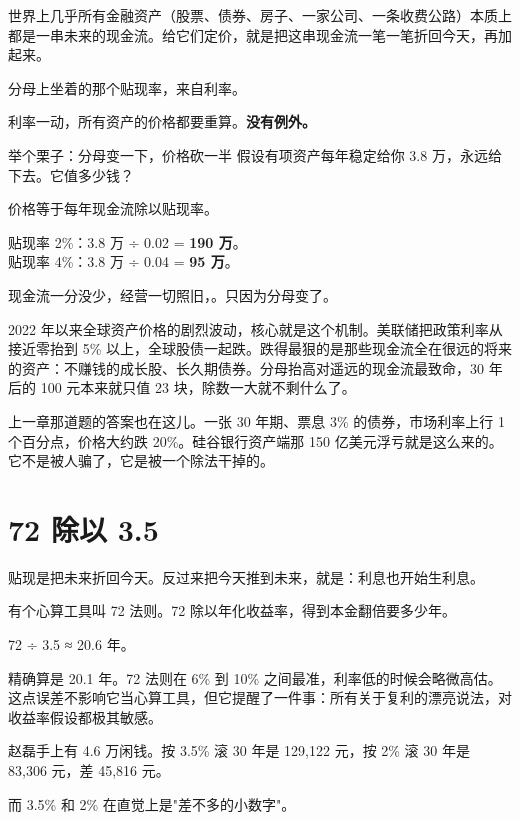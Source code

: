 世界上几乎所有金融资产（股票、债券、房子、一家公司、一条收费公路）本质上都是一串未来的现金流。给它们定价，就是把这串现金流一笔一笔折回今天，再加起来。

分母上坐着的那个贴现率，来自利率。

\begin{pullquote}{}
利率一动，所有资产的价格都要重算。\textbf{没有例外。}
\end{pullquote}

\begin{egbox}{举个栗子：分母变一下，价格砍一半}
假设有项资产每年稳定给你 3.8 万，永远给下去。它值多少钱？

价格等于每年现金流除以贴现率。

贴现率 2\%：3.8 万 ÷ 0.02 = \textbf{190 万}。\\ 贴现率 4\%：3.8 万 ÷ 0.04 = \textbf{95 万}。

现金流一分没少，经营一切照旧，。只因为分母变了。

2022 年以来全球资产价格的剧烈波动，核心就是这个机制。美联储把政策利率从接近零抬到 5\% 以上，全球股债一起跌。跌得最狠的是那些现金流全在很远的将来的资产：不赚钱的成长股、长久期债券。分母抬高对遥远的现金流最致命，30 年后的 100 元本来就只值 23 块，除数一大就不剩什么了。

上一章那道题的答案也在这儿。一张 30 年期、票息 3\% 的债券，市场利率上行 1 个百分点，价格大约跌 20\%。硅谷银行资产端那 150 亿美元浮亏就是这么来的。它不是被人骗了，它是被一个除法干掉的。

\end{egbox}

\section{72 除以 3.5}

贴现是把未来折回今天。反过来把今天推到未来，就是：利息也开始生利息。

有个心算工具叫 72 法则。72 除以年化收益率，得到本金翻倍要多少年。

72 ÷ 3.5 ≈ 20.6 年。

精确算是 20.1 年。72 法则在 6\% 到 10\% 之间最准，利率低的时候会略微高估。这点误差不影响它当心算工具，但它提醒了一件事：所有关于复利的漂亮说法，对收益率假设都极其敏感。

赵磊手上有 4.6 万闲钱。按 3.5\% 滚 30 年是 129,122 元，按 2\% 滚 30 年是 83,306 元，差 45,816 元。

而 3.5\% 和 2\% 在直觉上是"差不多的小数字"。

